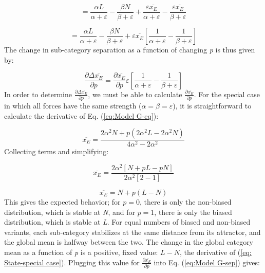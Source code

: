 \begin{equation}
=\frac{\alpha L}{\alpha+\varepsilon}-\frac{\beta N}{\beta+\varepsilon}+\frac{\varepsilon\overline{x_{E}}}{\alpha+\varepsilon}-\frac{\varepsilon\overline{x_{E}}}{\beta+\varepsilon}
\end{equation}

\begin{equation}
=\frac{\alpha L}{\alpha+\varepsilon}-\frac{\beta N}{\beta+\varepsilon}+\varepsilon\overline{x_{E}}[\frac{1}{\alpha+\varepsilon}-\frac{1}{\beta+\varepsilon}]
\end{equation}
The change in sub-category separation as a function of changing \emph{p}
is thus given by:

\begin{equation}
\frac{\partial\Delta\overline{x_{E}}}{\partial p}=\frac{\partial\overline{x_{E}}}{\partial p}\varepsilon[\frac{1}{\alpha+\varepsilon}-\frac{1}{\beta+\varepsilon}]\label{eq:Model G-sep}
\end{equation}
In order to determine $\frac{\partial\Delta\overline{x_{E}}}{\partial p}$,
we must be able to calculate $\frac{\partial\overline{x_{E}}}{\partial p}$.
For the special case in which all forces have the same strength ($\alpha=\beta=\varepsilon$),
it is straightforward to calculate the derivative of Eq. (\ref{eq:Model G-eq}):

\begin{equation}
\overline{x_{E}}=\frac{2\alpha^{2}N+p(2\alpha^{2}L-2\alpha^{2}N)}{4\alpha^{2}-2\alpha^{2}}
\end{equation}
Collecting terms and simplifying:

\begin{equation}
\overline{x_{E}}=\frac{2\alpha^{2}[N+pL-pN]}{2\alpha^{2}[2-1]}
\end{equation}

\begin{equation}
\overline{x_{E}}=N+p(L-N)\label{eq: State-special case}
\end{equation}
This gives the expected behavior; for $p=0$, there is only the non-biased
distribution, which is stable at \emph{N}, and for $p=1$, there is
only the biased distribution, which is stable at \emph{L}. For equal
numbers of biased and non-biased variants, each sub-category stabilizes
at the same distance from its attractor, and the global mean is halfway
between the two. The change in the global category mean as a function
of \emph{p} is a positive, fixed value: $L-N$, the derivative of
(\ref{eq: State-special case}). Plugging this value for $\frac{\partial\overline{x_{E}}}{\partial p}$
into Eq. (\ref{eq:Model G-sep}) gives:

